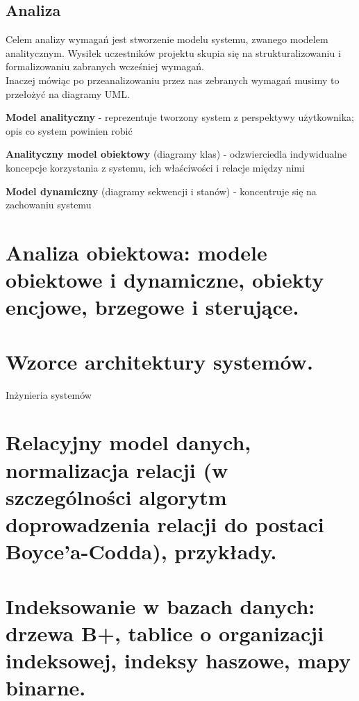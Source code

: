 \documentclass[12pt]{article}
\begin{document}
    \subsection{Analiza}
    
    \begin{definition}
    Celem analizy wymagań jest stworzenie modelu systemu, zwanego modelem analitycznym. Wysiłek uczestników projektu skupia się na strukturalizowaniu i formalizowaniu zabranych wcześniej wymagań. \\
    Inaczej mówiąc po przeanalizowaniu przez nas zebranych wymagań musimy to przełożyć na diagramy UML.
    \end{definition}
    
    \begin{definition}
    \textbf{Model analityczny} - reprezentuje tworzony system z perspektywy użytkownika; opis co system powinien robić
    \end{definition}
    
    \begin{definition}
    \textbf{Analityczny model obiektowy} (diagramy klas) - odzwierciedla indywidualne koncepcje korzystania z systemu, ich właściwości i relacje między nimi
    \end{definition}
    
    \begin{definition}
    \textbf{Model dynamiczny} (diagramy sekwencji i stanów) - koncentruje się na zachowaniu systemu
    \end{definition}
    
    \newpage
    
    \section{Analiza obiektowa: modele obiektowe i dynamiczne, obiekty encjowe, brzegowe i sterujące.}
    \section{Wzorce architektury systemów.}

    {\Large Inżynieria systemów}

    \section{Relacyjny model danych, normalizacja relacji (w szczególności algorytm doprowadzenia relacji do postaci Boyce’a-Codda), przykłady.}
    \section{Indeksowanie w bazach danych: drzewa B+, tablice o organizacji indeksowej, indeksy haszowe, mapy binarne.}
\end{document}
